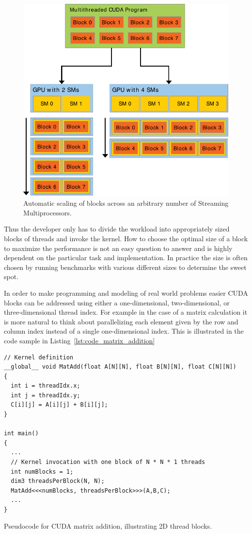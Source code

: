 \documentclass[a4paper,11pt]{kth-mag}
\begin{document}
\begin{figure}[!htbp]
  \centering
  \includegraphics[width=\textwidth]{img/automatic_scaling.pdf}
  \caption{Automatic scaling of blocks across an arbitrary number of Streaming Multiprocessors.}
  \label{fig:automatic_scaling}
\end{figure}

Thus the developer only has to divide the workload into appropriately sized blocks of threads and invoke the kernel. How to choose the optimal size of a block to maximize the performance is not an easy question to answer and is highly dependent on the particular task and implementation. In practice the size is often chosen by running benchmarks with various different sizes to determine the sweet spot.

In order to make programming and modeling of real world problems easier CUDA blocks can be addressed using either a one-dimensional, two-dimensional, or three-dimensional thread index. For example in the case of a matrix calculation it is more natural to think about parallelizing each element given by the row and column index instead of a single one-dimensional index. This is illustrated in the code sample in Listing~\ref{lst:code_matrix_addition}

\begin{listing}[!htbp]
  \centering
  \begin{verbatim}
// Kernel definition
__global__ void MatAdd(float A[N][N], float B[N][N], float C[N][N])
{
  int i = threadIdx.x;
  int j = threadIdx.y;
  C[i][j] = A[i][j] + B[i][j];
}

int main()
{
  ...
  // Kernel invocation with one block of N * N * 1 threads
  int numBlocks = 1;
  dim3 threadsPerBlock(N, N);
  MatAdd<<<numBlocks, threadsPerBlock>>>(A,B,C);
  ...
}
  \end{verbatim}
  \caption{Pseudocode for CUDA matrix addition, illustrating 2D thread blocks.}
  \label{lst:code_matrix_addition}
\end{listing}
\end{document}
